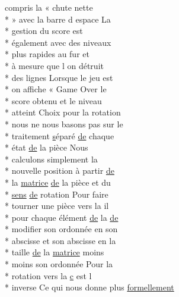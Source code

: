 \begin{DoxyCompactItemize}
compris la « chute nette \\*
» avec la barre d espace La \\*
gestion du score est \\*
également avec des niveaux \\*
plus rapides au fur et \\*
à mesure que l on détruit \\*
des lignes Lorsque le jeu est \\*
on affiche « Game Over le \\*
score obtenu et le niveau \\*
atteint Choix pour la rotation \\*
nous ne nous basons pas sur le \\*
traitement \hyperlink{gl_8h_ad585a1393cfa368fa9dc3d8ebff640d5}{s}éparé \hyperlink{mainpage_8dox_ab37fa35e77d95c6d0d0ab620c97c3db8}{de} chaque \\*
état \hyperlink{mainpage_8dox_ab37fa35e77d95c6d0d0ab620c97c3db8}{de} la pièce Nous \\*
calculons simplement la \\*
nouvelle position à partir \hyperlink{mainpage_8dox_ab37fa35e77d95c6d0d0ab620c97c3db8}{de} \\*
la \hyperlink{mainpage_8dox_af2e36bcdda8980a3e5c1f4013331ee45}{matrice} \hyperlink{mainpage_8dox_ab37fa35e77d95c6d0d0ab620c97c3db8}{de} la pièce et du \\*
\hyperlink{mainpage_8dox_aa08a2c237abaf70493855740d9c5d0c8}{sens} \hyperlink{mainpage_8dox_ab37fa35e77d95c6d0d0ab620c97c3db8}{de} rotation Pour faire \\*
tourner une pièce vers la il \\*
pour chaque élément \hyperlink{mainpage_8dox_ab37fa35e77d95c6d0d0ab620c97c3db8}{de} la \hyperlink{mainpage_8dox_ab37fa35e77d95c6d0d0ab620c97c3db8}{de} \\*
modifier son ordonnée en son \\*
abscisse et son abscisse en la \\*
taille \hyperlink{mainpage_8dox_ab37fa35e77d95c6d0d0ab620c97c3db8}{de} la \hyperlink{mainpage_8dox_af2e36bcdda8980a3e5c1f4013331ee45}{matrice} moins \\*
moins son ordonnée Pour la \\*
rotation vers la \hyperlink{glext_8h_a1f2d7f8147412c43ba2303a56f97ee73}{c} est l \\*
inverse Ce qui nous donne plus \hyperlink{mainpage_8dox_a8ffca62ef80121335ee87bc64b966cfa}{formellement}
\item 

\end{DoxyCompactItemize}
